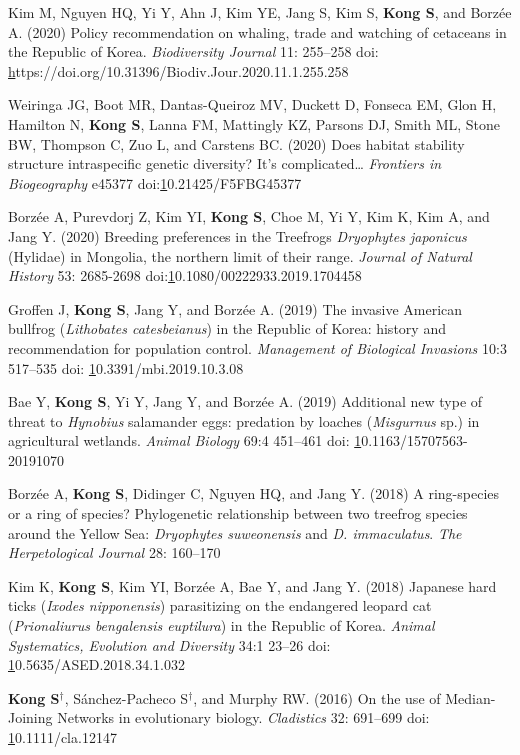 \documentclass[11pt]{article}
\begin{document}
\begin{etaremune}
\item Kim M, Nguyen HQ, Yi Y, Ahn J, Kim YE, Jang S, Kim S, \textbf{Kong S}, and Borzée A. (2020) Policy recommendation on whaling, trade and watching of cetaceans in the Republic of Korea. \textit{Biodiversity Journal} 11: 255–258 doi: \href{https://doi.org/10.31396/Biodiv.Jour.2020.11.1.255.258}https://doi.org/10.31396/Biodiv.Jour.2020.11.1.255.258
\item Weiringa JG, Boot MR,  Dantas-Queiroz MV, Duckett D, Fonseca EM, Glon H, Hamilton N, \textbf{Kong S}, Lanna FM, Mattingly KZ, Parsons DJ, Smith ML, Stone BW, Thompson C, Zuo L, and Carstens BC. (2020) Does habitat stability structure intraspecific genetic diversity? It’s complicated… \textit{Frontiers in Biogeography} e45377 doi:\href{https://doi.org/10.21425/F5FBG45377}10.21425/F5FBG45377
\item Borzée A, Purevdorj Z, Kim YI, \textbf{Kong S}, Choe M, Yi Y, Kim K, Kim A, and Jang Y. (2020) Breeding preferences in the Treefrogs \textit{Dryophytes japonicus} (Hylidae) in Mongolia, the northern limit of their range. \textit{Journal of Natural History} 53: 2685-2698 doi:\href{10.1080/00222933.2019.1704458}10.1080/00222933.2019.1704458
\item Groffen J, \textbf{Kong S}, Jang Y, and Borzée A. (2019) The invasive American bullfrog (\textit{Lithobates catesbeianus}) in the Republic of Korea: history and recommendation for population control. \textit{Management of Biological Invasions} 10:3 517–535 doi: \href{10.3391/mbi.2019.10.3.08}10.3391/mbi.2019.10.3.08
\item Bae Y, \textbf{Kong S}, Yi Y, Jang Y, and Borzée A. (2019) Additional new type of threat to \textit{Hynobius} salamander eggs: predation by loaches (\textit{Misgurnus} sp.) in agricultural wetlands. \textit{Animal Biology} 69:4 451–461 doi: \href{https://doi.org/10.1163/15707563-20191070}10.1163/15707563-20191070
\item Borzée A,\textbf{ Kong S}, Didinger C, Nguyen HQ, and Jang Y. (2018) A ring-species or a ring of species? Phylogenetic relationship between two treefrog species around the Yellow Sea: \textit{Dryophytes suweonensis }and \textit{D. immaculatus}. \textit{The Herpetological Journal} 28: 160–170 
\item Kim K, \textbf{Kong S}, Kim YI, Borzée A, Bae Y, and Jang Y. (2018) Japanese hard ticks (\textit{Ixodes nipponensis}) parasitizing on the endangered leopard cat (\textit{Prionaliurus bengalensis euptilura}) in the Republic of Korea. \textit{Animal Systematics, Evolution and Diversity} 34:1 23–26 doi: \href{10.5635/ASED.2018.34.1.032}10.5635/ASED.2018.34.1.032
\item \textbf{Kong S}{$^\dag$}, Sánchez-Pacheco S{$^\dag$}, and Murphy RW. (2016) On the use of Median-Joining Networks in evolutionary biology. \textit{Cladistics} 32: 691–699 doi: \href{https://doi.org/10.1111/cla.12147}10.1111/cla.12147

\end{etaremune}
\end{document}
